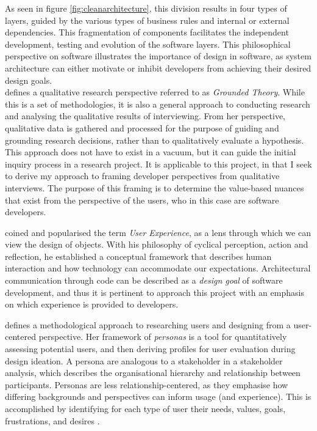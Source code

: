 \documentclass[../report.tex]{subfiles}
\begin{document}
As seen in figure \ref{fig:cleanarchitecture}, this division results in four types of layers, guided by the various types of business rules and internal or external dependencies. This fragmentation of components facilitates the independent development, testing and evolution of the software layers. This philosophical perspective on software illustrates the importance of design in software, as system architecture can either motivate or inhibit developers from achieving their desired design goals. \\


\cite{charmaz2006constructing} defines a qualitative research perspective referred to as \textit{Grounded Theory}. While this is a set of methodologies, it is also a general approach to conducting research and analysing the qualitative results of interviewing. From her perspective, qualitative data is gathered and processed for the purpose of guiding and grounding research decisions, rather than to qualitatively evaluate a hypothesis. This approach does not have to exist in a vacuum, but it can guide the initial inquiry process in a research project. It is applicable to this project, in that I seek to derive my approach to framing developer perspectives from qualitative interviews. The purpose of this framing is to determine the value-based nuances that exist from the perspective of the users, who in this case are software developers.

\cite{norman2013design} coined and popularised the term \textit{User Experience}, as a lens through which we can view the design of objects. With his philosophy of cyclical perception, action and reflection, he established a conceptual framework that describes human interaction and how technology can accommodate our expectations. Architectural communication through code can be described as a \textit{design goal} of software development, and thus it is pertinent to approach this project with an emphasis on which experience is provided to developers.

\cite{buley2013user} defines a methodological approach to researching users and designing from a user-centered perspective. Her framework of \textit{personas} is a tool for quantitatively assessing potential users, and then deriving profiles for user evaluation during design ideation. A persona are analogous to a stakeholder in a stakeholder analysis, which describes the organisational hierarchy and relationship between participants. Personas are less relationship-centered, as they emphasise how differing backgrounds and perspectives can inform usage (and experience). This is accomplished by identifying for each type of user their needs, values, goals, frustrations, and desires \cite[p. 132]{buley2013user}. \\
\end{document}
